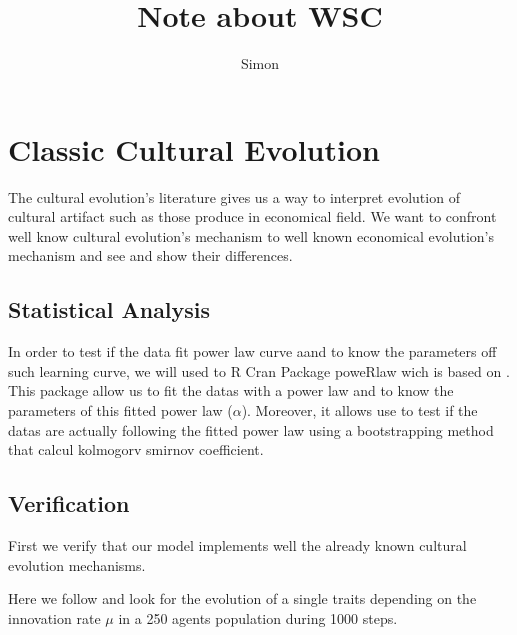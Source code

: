 \documentclass[a4paper]{article}
\title{Note about WSC}
\author{Simon}
\begin{document}
\maketitle
\section{Classic Cultural Evolution}





The cultural evolution's literature gives us a way to interpret evolution of cultural artifact such as those produce in economical field. We want to confront well know cultural evolution's mechanism to well known economical evolution's mechanism and see and show their differences.

\subsection{Statistical Analysis}
In order to test if the data fit power law curve aand to know the parameters off such learning curve, we will used to R Cran Package poweRlaw \cite{gillespie2015fittingheavytaileddistributionsthepowerlawpackage} wich is based on \cite{clauset2009powerlawdistributionsinempiricaldat}. This package allow us to fit the datas with a power law and to know the parameters of this fitted power law ($\alpha$). Moreover, it allows use to test if the datas are actually following the fitted power law using a bootstrapping method that calcul kolmogorv smirnov coefficient.

\subsection{Verification}

First we verify that our model implements well the already known cultural evolution mechanisms.

Here we follow \cite{mesoudi2009randomcopyingfrequencydependencopyingandulturechange,bentley2004randomdriftandculturechange} and look for the evolution of a single traits depending on the innovation rate $\mu$ in a 250 agents population during 1000 steps.
\end{document}
